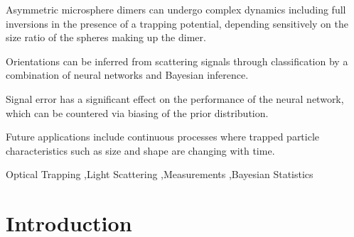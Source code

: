 \documentclass[final,  3p]{elsarticle}
\begin{document}
\begin{frontmatter}
\begin{highlights}
\item Asymmetric microsphere dimers can undergo complex dynamics including full inversions in the presence of a trapping potential, depending sensitively on the size ratio of the spheres making up the dimer.  
\item Orientations can be inferred from scattering signals through classification by a combination of neural networks and Bayesian inference. 
\item Signal error has a significant effect on the performance of the neural network, which can be countered via biasing of the prior distribution. 
\item Future applications include continuous processes where trapped particle characteristics such as size and shape are changing with time.  
\end{highlights}

\begin{keyword}
	Optical Trapping \sep Light Scattering \sep Measurements \sep Bayesian Statistics 
\end{keyword}

\end{frontmatter}

\section{Introduction}
\label{sec:Intro}
\end{document}
